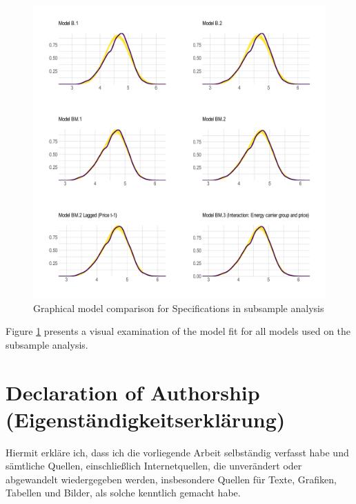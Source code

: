 \documentclass[12pt,twoside]{reedthesis}
\begin{document}
\newpage
\begin{figure}

{\centering \includegraphics[width=1\linewidth]{figure/plot-model-comparison} 

}

\caption{Graphical model comparison for Specifications in subsample analysis}\label{fig:plot-model-comparison}
\end{figure}
\noindent
Figure \ref{fig:plot-model-comparison} presents a visual examination of the model fit for all models used on the subsample analysis.

\newpage

\onehalfspacing

\hypertarget{declaration-of-authorship-eigenstuxe4ndigkeitserkluxe4rung}{%
\chapter*{Declaration of Authorship (Eigenständigkeitserklärung)}\label{declaration-of-authorship-eigenstuxe4ndigkeitserkluxe4rung}}

Hiermit erkläre ich, dass ich die vorliegende Arbeit selbständig verfasst habe und sämtliche Quellen, einschließlich Internetquellen, die unverändert oder abgewandelt wiedergegeben werden, insbesondere Quellen für Texte, Grafiken, Tabellen und Bilder, als solche kenntlich gemacht habe.
\end{document}
